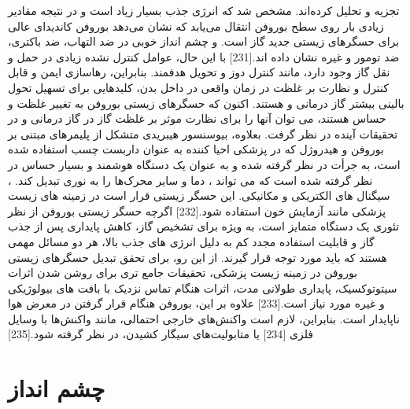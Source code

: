  تجزیه و تحلیل کرده‌اند. مشخص شد که انرژی جذب بسیار زیاد است و در نتیجه مقادیر زیادی بار روی سطح بوروفن انتقال می‌یابد که نشان می‌دهد بوروفن کاندیدای عالی برای حسگرهای زیستی جدید گاز است.  و  چشم انداز خوبی در ضد التهاب، ضد باکتری، ضد تومور و غیره نشان داده اند.\cite{otterbeinCarbonMonoxideHas2000}[231] با این حال، عوامل کنترل نشده زیادی در حمل و نقل گاز وجود دارد، مانند کنترل دوز و تحویل هدفمند. بنابراین، رهاسازی ایمن و قابل کنترل و نظارت بر غلظت در زمان واقعی در داخل بدن، کلیدهایی برای تسهیل تحول بالینی بیشتر گاز درمانی  و  هستند. اکنون که حسگرهای زیستی بوروفن به تغییر غلظت  و  حساس هستند، می توان آنها را برای نظارت موثر بر غلظت گاز در گاز درمانی  و  در تحقیقات آینده در نظر گرفت. بعلاوه، بیوسنسور هیبریدی متشکل از پلیمرهای مبتنی بر بوروفن و هیدروژل که در پزشکی احیا کننده به عنوان داربست چسب استفاده شده است، به جرأت در نظر گرفته شده و به عنوان یک دستگاه هوشمند و بسیار حساس در نظر گرفته شده است که می تواند ، دما و سایر محرک‌ها را به نوری تبدیل کند. ، سیگنال های الکتریکی و مکانیکی. این حسگر زیستی قرار است در زمینه های زیست پزشکی مانند آزمایش خون استفاده شود.\cite{inchingoloNonsyndromicMultipleSupernumerary2010}[232] اگرچه حسگر زیستی بوروفن از نظر تئوری یک دستگاه متمایز است، به ویژه برای تشخیص گاز، کاهش پایداری پس از جذب گاز و قابلیت استفاده مجدد کم به دلیل انرژی های جذب بالا، هر دو مسائل مهمی هستند که باید مورد توجه قرار گیرند. از این رو، برای تحقق تبدیل حسگرهای زیستی بوروفن در زمینه زیست پزشکی، تحقیقات جامع تری برای روشن شدن اثرات سیتوتوکسیک، پایداری طولانی مدت، اثرات هنگام تماس نزدیک با بافت های بیولوژیکی و غیره مورد نیاز است.\cite{tatulloBorophenePromising2D2019}[233] علاوه بر این، بوروفن هنگام قرار گرفتن در معرض هوا ناپایدار است. بنابراین، لازم است واکنش‌های خارجی احتمالی، مانند واکنش‌ها با وسایل فلزی \cite{inchingoloOralPiercingOral2011}[234] یا متابولیت‌های سیگار کشیدن، در نظر گرفته شود.\cite{tatulloCrosstalkOralGeneral2016}[235]

\section{چشم انداز}

